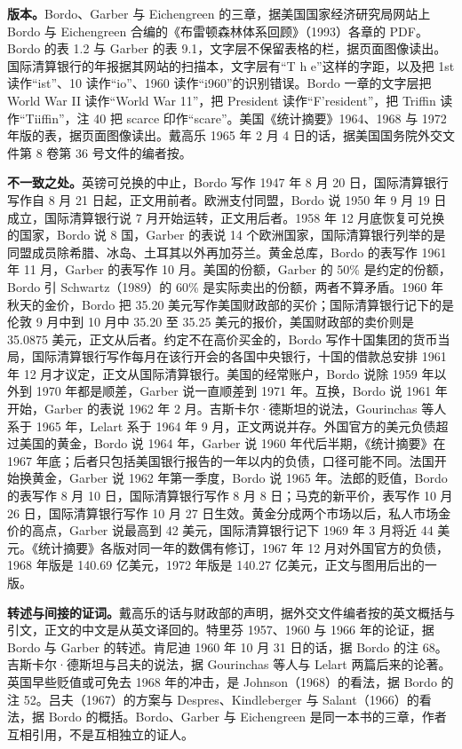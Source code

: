 \begin{deeper}[史料说明]
\textbf{版本。}Bordo、Garber 与 Eichengreen 的三章，据美国国家经济研究局网站上 Bordo 与 Eichengreen 合编的《布雷顿森林体系回顾》（1993）各章的 PDF。Bordo 的表 1.2 与 Garber 的表 9.1，文字层不保留表格的栏，据页面图像读出。国际清算银行的年报据其网站的扫描本，文字层有“T h e”这样的字距，以及把 1st 读作“ist”、10 读作“io”、1960 读作“i960”的识别错误。Bordo 一章的文字层把 World War II 读作“World War 11”，把 President 读作“F'resident”，把 Triffin 读作“Tiiffin”，注 40 把 scarce 印作“scare”。美国《统计摘要》1964、1968 与 1972 年版的表，据页面图像读出。戴高乐 1965 年 2 月 4 日的话，据美国国务院外交文件第 8 卷第 36 号文件的编者按。

\textbf{不一致之处。}英镑可兑换的中止，Bordo 写作 1947 年 8 月 20 日，国际清算银行写作自 8 月 21 日起，正文用前者。欧洲支付同盟，Bordo 说 1950 年 9 月 19 日成立，国际清算银行说 7 月开始运转，正文用后者。1958 年 12 月底恢复可兑换的国家，Bordo 说 8 国，Garber 的表说 14 个欧洲国家，国际清算银行列举的是同盟成员除希腊、冰岛、土耳其以外再加芬兰。黄金总库，Bordo 的表写作 1961 年 11 月，Garber 的表写作 10 月。美国的份额，Garber 的 50\% 是约定的份额，Bordo 引 Schwartz（1989）的 60\% 是实际卖出的份额，两者不算矛盾。1960 年秋天的金价，Bordo 把 35.20 美元写作美国财政部的买价；国际清算银行记下的是伦敦 9 月中到 10 月中 35.20 至 35.25 美元的报价，美国财政部的卖价则是 35.0875 美元，正文从后者。约定不在高价买金的，Bordo 写作十国集团的货币当局，国际清算银行写作每月在该行开会的各国中央银行，十国的借款总安排 1961 年 12 月才议定，正文从国际清算银行。美国的经常账户，Bordo 说除 1959 年以外到 1970 年都是顺差，Garber 说一直顺差到 1971 年。互换，Bordo 说 1961 年开始，Garber 的表说 1962 年 2 月。吉斯卡尔·德斯坦的说法，Gourinchas 等人系于 1965 年，Lelart 系于 1964 年 9 月，正文两说并存。外国官方的美元负债超过美国的黄金，Bordo 说 1964 年，Garber 说 1960 年代后半期，《统计摘要》在 1967 年底；后者只包括美国银行报告的一年以内的负债，口径可能不同。法国开始换黄金，Garber 说 1962 年第一季度，Bordo 说 1965 年。法郎的贬值，Bordo 的表写作 8 月 10 日，国际清算银行写作 8 月 8 日；马克的新平价，表写作 10 月 26 日，国际清算银行写作 10 月 27 日生效。黄金分成两个市场以后，私人市场金价的高点，Garber 说最高到 42 美元，国际清算银行记下 1969 年 3 月将近 44 美元。《统计摘要》各版对同一年的数偶有修订，1967 年 12 月对外国官方的负债，1968 年版是 140.69 亿美元，1972 年版是 140.27 亿美元，正文与图用后出的一版。

\textbf{转述与间接的证词。}戴高乐的话与财政部的声明，据外交文件编者按的英文概括与引文，正文的中文是从英文译回的。特里芬 1957、1960 与 1966 年的论证，据 Bordo 与 Garber 的转述。肯尼迪 1960 年 10 月 31 日的话，据 Bordo 的注 68。吉斯卡尔·德斯坦与吕夫的说法，据 Gourinchas 等人与 Lelart 两篇后来的论著。英国早些贬值或可免去 1968 年的冲击，是 Johnson（1968）的看法，据 Bordo 的注 52。吕夫（1967）的方案与 Despres、Kindleberger 与 Salant（1966）的看法，据 Bordo 的概括。Bordo、Garber 与 Eichengreen 是同一本书的三章，作者互相引用，不是互相独立的证人。


\end{deeper}
